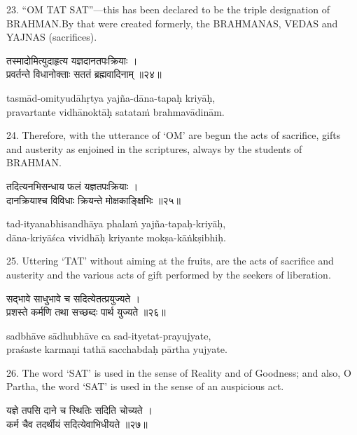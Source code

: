 23. ``OM TAT SAT''---this has been declared to be the triple designation of
BRAHMAN.\@ By that were created formerly, the BRAHMANAS, VEDAS and YAJNAS
(sacrifices).

\begin{gitaverse}
तस्मादोमित्युदाहृत्य यज्ञदानतपःक्रियाः । \\
प्रवर्तन्ते विधानोक्ताः सततं ब्रह्मवादिनाम् ॥२४॥
\end{gitaverse}

\begin{transliteration}
tasmād-omityudāhṛtya yajña-dāna-tapaḥ kriyāḥ, \\
pravartante vidhānoktāḥ satataṁ brahmavādinām.
\end{transliteration}

24. Therefore, with the utterance of `OM' are begun the acts of sacrifice,
gifts and austerity as enjoined in the scriptures, always by the students of
BRAHMAN.\@

\begin{gitaverse}
तदित्यनभिसन्धाय फलं यज्ञतपःक्रियाः । \\
दानक्रियाश्च विविधाः क्रियन्ते मोक्षकाङ्क्षिभिः ॥२५॥
\end{gitaverse}

\begin{transliteration}
tad-ityanabhisandhāya phalaṁ yajña-tapaḥ-kriyāḥ, \\
dāna-kriyāśca vividhāḥ kriyante mokṣa-kāṅkṣibhiḥ.
\end{transliteration}

25. Uttering `TAT' without aiming at the fruits, are the acts of sacrifice and
austerity and the various acts of gift performed by the seekers of liberation.

\begin{gitaverse}
सद्भावे साधुभावे च सदित्येतत्प्रयुज्यते । \\
प्रशस्ते कर्मणि तथा सच्छब्दः पार्थ युज्यते ॥२६॥
\end{gitaverse}

\begin{transliteration}
sadbhāve sādhubhāve ca sad-ityetat-prayujyate, \\
praśaste karmaṇi tathā sacchabdaḥ pārtha yujyate.
\end{transliteration}

26. The word `SAT' is used in the sense of Reality and of Goodness; and also, O
Partha, the word `SAT' is used in the sense of an auspicious act.

\begin{gitaverse}
यज्ञे तपसि दाने च स्थितिः सदिति चोच्यते । \\
कर्म चैव तदर्थीयं सदित्येवाभिधीयते ॥२७॥
\end{gitaverse}

